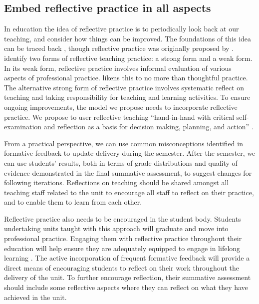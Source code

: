 
\subsection{Embed reflective practice in all aspects} %
\label{ssub:embed_reflective_practice_in_all_aspects}

In education the idea of reflective practice is to periodically look back at our teaching, and consider how things can be improved. The foundations of this idea can be traced back \citet{Dewey:1933}, though reflective practice was originally proposed by \citet{Schon:1983}. \citet{Farrell:2007,Farrell:2008} identify two forms of reflective teaching practice: a strong form and a weak form. In its weak form, reflective practice involves informal evaluation of various aspects of professional practice. \citet{Farrell:2008} likens this to no more than thoughtful practice. The alternative strong form of reflective practice involves systematic reflect on teaching and taking responsibility for teaching and learning activities. To ensure ongoing improvements, the model we propose needs to incorporate reflective practice. We propose to user reflective teaching ``hand-in-hand with critical self-examination and reflection as a basis for decision making, planning, and action'' \cite{Richards:1994}. %

From a practical perspective, we can use common misconceptions identified in formative feedback to update delivery during the semester. After the semester, we can use students' results, both in terms of grade distributions and quality of evidence demonstrated in the final summative assessment, to suggest changes for following iterations. Reflections on teaching should be shared amongst all teaching staff related to the unit to encourage all staff to reflect on their practice, and to enable them to learn from each other.

Reflective practice also needs to be encouraged in the student body. Students undertaking units taught with this approach will graduate and move into professional practice. Engaging them with reflective practice throughout their education will help ensure they are adequately equipped to engage in lifelong learning \cite{Field:2006}. The active incorporation of frequent formative feedback will provide a direct means of encouraging students to reflect on their work throughout the delivery of the unit. To further encourage reflection, their summative assessment should include some reflective aspects where they can reflect on what they have achieved in the unit. 

